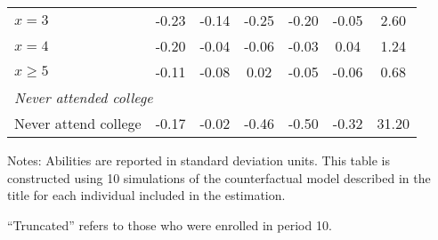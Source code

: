 \begin{table}[ht]
{\begin{threeparttable}
\begin{tabular}{lcccccc}
$x=3$&-0.23&-0.14&-0.25&-0.20&-0.05&2.60 \\
$x=4$&-0.20&-0.04&-0.06&-0.03&0.04&1.24 \\
$x\geq5$&-0.11&-0.08&0.02&-0.05&-0.06&0.68 \\
\midrule
\multicolumn{7}{l}{\emph{Never attended college}}\\
Never attend college&-0.17&-0.02&-0.46&-0.50&-0.32&31.20 \\
\bottomrule
\end{tabular}
\footnotesize Notes: Abilities are reported in standard deviation units. This table is constructed using 10 simulations of the counterfactual model described in the title for each individual included in the estimation.

\medskip

``Truncated'' refers to those who were enrolled in period 10.
\end{threeparttable}
}
\end{table}
